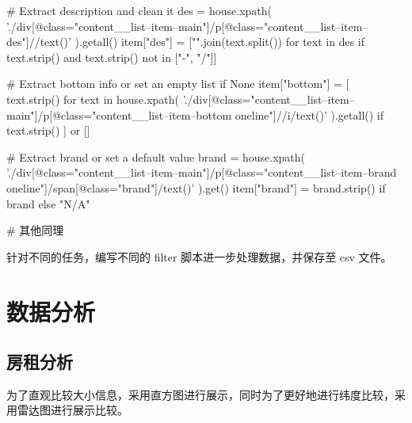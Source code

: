 \begin{python3code}
    # Extract description and clean it
    des = house.xpath(
        './div[@class="content__list--item--main"]/p[@class="content__list--item--des"]//text()'
    ).getall()
    item["des"] = ["".join(text.split()) for text in des if text.strip() and text.strip() not in ["-", "/"]]

    # Extract bottom info or set an empty list if None
    item["bottom"] = [
        text.strip()
        for text in house.xpath(
            './div[@class="content__list--item--main"]/p[@class="content__list--item--bottom oneline"]//i/text()'
        ).getall()
        if text.strip()
    ] or []

    # Extract brand or set a default value
    brand = house.xpath(
        './div[@class="content__list--item--main"]/p[@class="content__list--item--brand oneline"]/span[@class="brand"]/text()'
    ).get()
    item["brand"] = brand.strip() if brand else "N/A"

    # 其他同理
\end{python3code}

针对不同的任务，编写不同的 filter 脚本进一步处理数据，并保存至 csv 文件。

\section{数据分析}

\subsection{房租分析}
为了直观比较大小信息，采用直方图进行展示，同时为了更好地进行纬度比较，采用雷达图进行展示比较。

